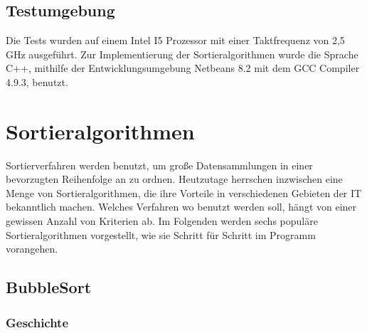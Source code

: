 \documentclass{article}
\begin{document}
\subsection{Testumgebung}
Die Tests wurden auf einem Intel I5 Prozessor mit einer Taktfrequenz von 2,5 GHz ausgeführt. Zur Implementierung der Sortieralgorithmen wurde die Sprache C++, mithilfe der Entwicklungsumgebung Netbeans 8.2 mit dem GCC Compiler 4.9.3, benutzt.

\section{Sortieralgorithmen}
Sortierverfahren werden benutzt, um große Datensammlungen in einer bevorzugten Reihenfolge an zu ordnen. Heutzutage herrschen inzwischen eine Menge von Sortieralgorithmen, die ihre Vorteile in verschiedenen Gebieten der IT bekanntlich machen. Welches Verfahren wo benutzt werden soll, hängt von einer gewissen Anzahl von Kriterien ab.
Im Folgenden werden sechs populäre Sortieralgorithmen vorgestellt, wie sie Schritt für Schritt im Programm vorangehen.

\subsection{BubbleSort}
\subsubsection{Geschichte}

\end{document}
